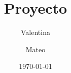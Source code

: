 \documentclass{beamer}
\title{Proyecto}
\author{Valentina \and Mateo}
\institute{Colegio San Bartolomé}
\date{\today}
\begin{document}
\begin{frame}
\titlepage
\end{frame}
\end{document}
